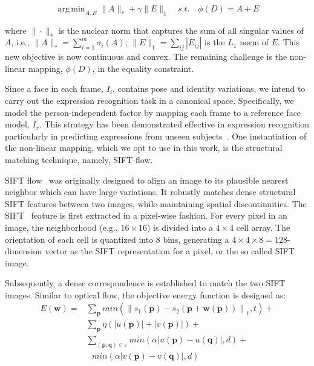 \documentclass[journal]{IEEEtran}
\DeclareMathOperator*{\argmin}{arg\,min}
\begin{document}
\begin{equation} \label{eq:rpca}
\argmin_{A,E} \|A\|_*+\gamma \|E\|_1  \quad s.t. \quad \phi (D) = A + E 
\end{equation}

\noindent where $\|\cdot\|_*$ is the nuclear norm that captures the sum of all singular values of $A$, i.e., $\|A\|_*=\sum^m_{i=1}\sigma_i(A)$; $\|E\|_1=\sum_{ij}|E_{ij}|$ is the $L_1$ norm of $E$. This new objective is now continuous and convex. The remaining challenge is the non-linear mapping, $\phi (D)$, in the equality constraint. 

Since a face in each frame, $I_i$, contains pose and identity variations, we intend to carry out the expression recognition task in a canonical space. Specifically, we model the person-independent factor by mapping each frame to a reference face model, $I_r$. This strategy has been demonstrated effective in expression recognition particularly in predicting expressions from unseen subjects~\cite{Yang_SMCB12,Dahmane_TMM14}. One instantiation of the non-linear mapping, which we opt to use in this work, is the structural matching technique, namely, SIFT-flow. 

SIFT flow~\cite{Liu_PAMI11} was originally designed to align an image to its plausible nearest neighbor which can have large variations. It robustly matches dense structural SIFT features between two images, while maintaining spatial discontinuities. The SIFT~\cite{Lowe_ICCV99} feature is first extracted in a pixel-wise fashion. For every pixel in an image, the neighborhood (e.g., $16\times16$) is divided into a $4\times4$ cell array. The orientation of each cell is quantized into 8 bins, generating a $4\times4\times8=128$-dimension vector as the SIFT representation for a pixel, or the so called SIFT image.

Subsequently, a dense correspondence is established to match the two SIFT images. Similar to optical flow, the objective energy function is designed as:
\begin{align}
	\label{data_term}
	E(\textbf{w})=&\sum_\textbf{p} min(\left\|s_1 (\textbf{p})-s_2 (\textbf{p}+\textbf{w}(\textbf{p}))\right\|_1 ,t)+
\\\label{small_constraint}
&\sum_\textbf{p} \eta(\left|u(\textbf{p})\right|+\left|v(\textbf{p})\right|) +
\\\nonumber
&\sum_{(\textbf{p},\textbf{q})\in\varepsilon} min(\alpha\left|u(\textbf{p})-u(\textbf{q})\right|,d)+
\\\label{smooth_constraint}
&~~~min(\alpha\left|v(\textbf{p})-v(\textbf{q})\right|,d)
\end{align}
\end{document}
